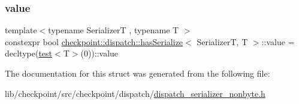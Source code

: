 \subsubsection{\texorpdfstring{value}{value}}
{\footnotesize\ttfamily template$<$typename SerializerT , typename T $>$ \\
constexpr bool \hyperlink{structcheckpoint_1_1dispatch_1_1has_serialize}{checkpoint\+::dispatch\+::has\+Serialize}$<$ SerializerT, T $>$\+::value = decltype(\hyperlink{structcheckpoint_1_1dispatch_1_1has_serialize_a615e980a87e3fca303990537a575a62b}{test}$<$T$>$(0))\+::value\hspace{0.3cm}{\ttfamily [static]}}



The documentation for this struct was generated from the following file\+:\begin{DoxyCompactItemize}
\item 
lib/checkpoint/src/checkpoint/dispatch/\hyperlink{dispatch__serializer__nonbyte_8h}{dispatch\+\_\+serializer\+\_\+nonbyte.\+h}\end{DoxyCompactItemize}
